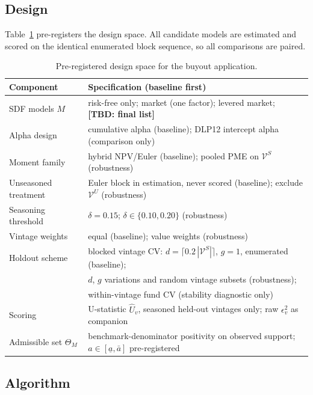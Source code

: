 \documentclass[11pt]{article}
\newcommand{\tbd}[1]{\textbf{[TBD: #1]}}
\begin{document}
\subsection{Design}
\label{sec:design}

Table~\ref{tab:design} pre-registers the design space. All candidate models are estimated and scored on the identical enumerated block sequence, so all comparisons are paired.

\begin{table}[H]
\centering
\small
\begin{tabular}{ll}
\toprule
Component & Specification (baseline first) \\
\midrule
SDF models \(M\) & risk-free only; market (one factor); levered market; \tbd{final list} \\
Alpha design & cumulative alpha (baseline); DLP12 intercept alpha (comparison only) \\
Moment family & hybrid NPV/Euler (baseline); pooled PME on \(\mathcal V^S\) (robustness) \\
Unseasoned treatment & Euler block in estimation, never scored (baseline); exclude \(\mathcal V^U\) (robustness) \\
Seasoning threshold & \(\delta=0.15\); \(\delta\in\{0.10,0.20\}\) (robustness) \\
Vintage weights & equal (baseline); value weights (robustness) \\
Holdout scheme & blocked vintage CV: \(d=\lceil 0.2\,|\mathcal V^S|\rceil\), \(g=1\), enumerated (baseline); \\
 & \quad \(d\), \(g\) variations and random vintage subsets (robustness); \\
 & \quad within-vintage fund CV (stability diagnostic only) \\
Scoring & U-statistic \(\widehat U_v\), seasoned held-out vintages only; raw \(\epsilon_v^2\) as companion \\
Admissible set \(\Theta_M\) & benchmark-denominator positivity on observed support; \(a\in[\underline a,\bar a]\) pre-registered \\
\bottomrule
\end{tabular}
\caption{Pre-registered design space for the buyout application.}
\label{tab:design}
\end{table}

\subsection{Algorithm}
\label{sec:algorithm}
\end{document}
